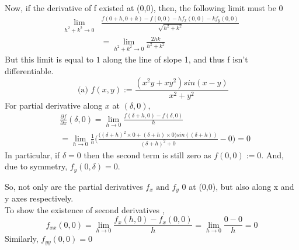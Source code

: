 \documentclass[20pt,a4paper]{extarticle} %
\theoremstyle{definition}
\theoremstyle{definition}
\begin{document}
Now, if the derivative of f existed at (0,0), then, the following limit must be 0
\begin{equation*}
	\begin{split}
		\lim_{h^2+k^2 \to 0}&\frac{f(0+h,0+k)-f(0,0) -hf_x(0,0)-kf_y(0,0)
		}{\sqrt{h^2+k^2}} \\
		&=\lim_{h^2+k^2 \to 0} \frac{2hk}{h^2+k^2}
\end{split}
\end{equation*}
But this limit is equal to $1$ along the line of slope 1, and thus f isn't differentiable.
\newpage
\[ \text{ (a) } f(x,y):=\frac{(x^2y+xy^2)sin(x-y)}{x^2+y^2}\]
For partial derivative along $x$ at $(\delta,0),$
\begin{equation*}
	\begin{split}
		&\frac{\partial f}{\partial x}(\delta,0) =\lim_{h \to 0} \frac{f(\delta +h,0)-f(\delta,0)}{h}	\\
		&=\lim_{h \to 0} \frac{1}{h} \big(
			\frac{\big( (\delta+h)^2 \times 0 + (\delta+h) \times 0 \big) sin((\delta+h))}
			{(\delta+h)^2+0}
		- 0\big)=0
	\end{split}
\end{equation*}
In particular, if $\delta=0$ then the second term is still zero as $f(0,0):=0$.
And, due to symmetry, $f_y(0,\delta)=0$.

So, not only are the partial derivatives $f_x \text{ and } f_y$ 0 at (0,0), but also along x and y
axes respectively.\\
To show the existence of second derivatives ,
\begin{equation*}
	f_{xx}(0,0) = \lim_{h \to 0} \frac{f_x(h,0)-f_x(0,0)}{h}=\lim_{h \to 0} \frac{0-0}{h}=0
\end{equation*}
Similarly, $f_{yy}(0,0)=0$
\end{document}

